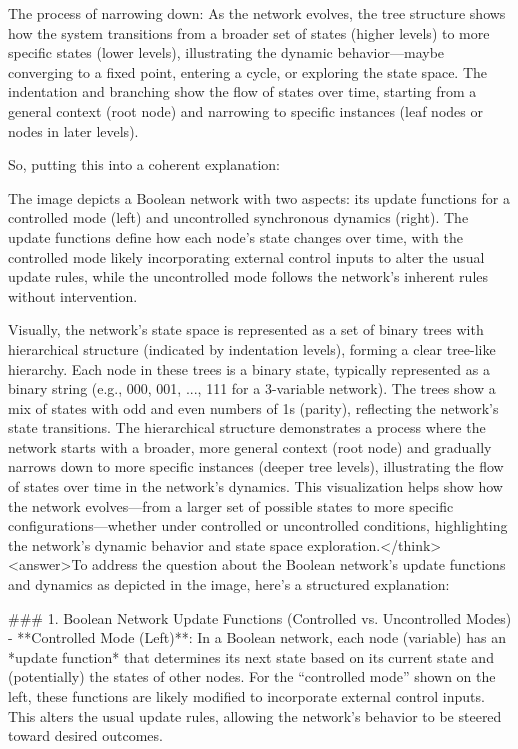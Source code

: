 The process of narrowing down: As the network evolves, the tree structure shows how the system transitions from a broader set of states (higher levels) to more specific states (lower levels), illustrating the dynamic behavior—maybe converging to a fixed point, entering a cycle, or exploring the state space. The indentation and branching show the flow of states over time, starting from a general context (root node) and narrowing to specific instances (leaf nodes or nodes in later levels).

So, putting this into a coherent explanation:

The image depicts a Boolean network with two aspects: its update functions for a controlled mode (left) and uncontrolled synchronous dynamics (right). The update functions define how each node’s state changes over time, with the controlled mode likely incorporating external control inputs to alter the usual update rules, while the uncontrolled mode follows the network’s inherent rules without intervention.  

Visually, the network’s state space is represented as a set of binary trees with hierarchical structure (indicated by indentation levels), forming a clear tree-like hierarchy. Each node in these trees is a binary state, typically represented as a binary string (e.g., 000, 001, ..., 111 for a 3-variable network). The trees show a mix of states with odd and even numbers of 1s (parity), reflecting the network’s state transitions. The hierarchical structure demonstrates a process where the network starts with a broader, more general context (root node) and gradually narrows down to more specific instances (deeper tree levels), illustrating the flow of states over time in the network’s dynamics. This visualization helps show how the network evolves—from a larger set of possible states to more specific configurations—whether under controlled or uncontrolled conditions, highlighting the network’s dynamic behavior and state space exploration.</think><answer>To address the question about the Boolean network’s update functions and dynamics as depicted in the image, here’s a structured explanation:  


### 1. Boolean Network Update Functions (Controlled vs. Uncontrolled Modes)  
- **Controlled Mode (Left)**:  
  In a Boolean network, each node (variable) has an *update function* that determines its next state based on its current state and (potentially) the states of other nodes. For the “controlled mode” shown on the left, these functions are likely modified to incorporate external control inputs. This alters the usual update rules, allowing the network’s behavior to be steered toward desired outcomes.  

